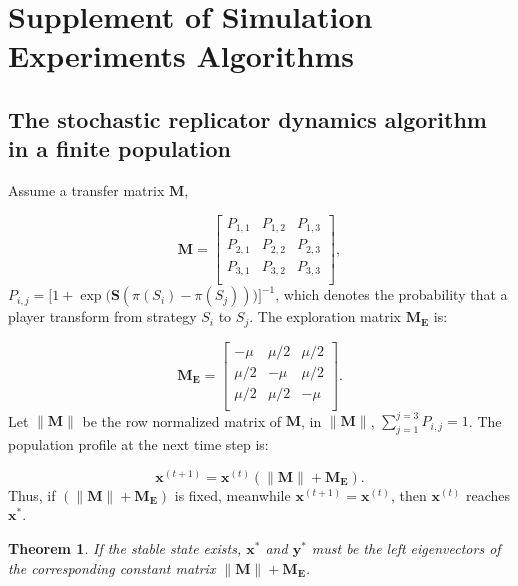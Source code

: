 \documentclass[letterpaper,10pt]{article}
\numberwithin{equation}{section}
\newtheorem{theorem}{Theorem}[section]
\begin{document}
\section{Supplement of Simulation Experiments Algorithms}\label{AppendixB}
\subsection{The stochastic replicator dynamics algorithm in a finite population}\label{AppendixB1}
Assume a transfer matrix $ \mathbf{M} $,

\begin{equation}
\mathbf{M} = 
    \begin{bmatrix}
    P_{1,1} & P_{1,2} & P_{1,3} \\
    P_{2,1} & P_{2,2} & P_{2,3} \\
    P_{3,1} & P_{3,2} & P_{3,3} \\
    \end{bmatrix},
    \label{transmatrix}
\end{equation}
$ P_{i,j} = \bigl[1+\exp \bigl(\mathbf{S}(\pi(S_{i})-\pi(S_{j}))\bigr)\bigr]^{-1} $, which denotes the probability that a player transform from strategy $ S_{i} $ to $ S_{j} $. The exploration matrix $ \mathbf{M_{E}} $ is:

\begin{equation}
\mathbf{M_{E}} = 
    \begin{bmatrix}
    -\mu & \mu/2 & \mu/2 \\
    \mu/2 & -\mu & \mu/2 \\
    \mu/2 & \mu/2 & -\mu \\
    \end{bmatrix}.
\end{equation}
Let $ \lVert \mathbf{M} \rVert $ be the row normalized matrix of $ \mathbf{M} $, in $ \lVert \mathbf{M} \rVert $, $ \sum_{j = 1}^{j = 3} P_{i,j} = 1 $. The population profile at the next time step is:

\begin{equation}
    \mathbf{x}^{(t+1)} = \mathbf{x}^{(t)} ( \lVert \mathbf{M} \rVert+\mathbf{M_{E}}). \label{update_x}
\end{equation}
Thus, if $ (\lVert \mathbf{M} \rVert+\mathbf{M_{E}}) $ is fixed, meanwhile $ \mathbf{x}^{(t+1)} = \mathbf{x}^{(t)} $, then $ \mathbf{x}^{(t)} $ reaches $ \mathbf{x}^* $.

\begin{theorem}\label{Theo: leftEigen}
If the stable state exists, $ \mathbf{x}^* $ and $ \mathbf{y}^* $ must be the left eigenvectors of the corresponding constant matrix $ \lVert \mathbf{M} \rVert+\mathbf{M_{E}} $.
\end{theorem}
\end{document}
